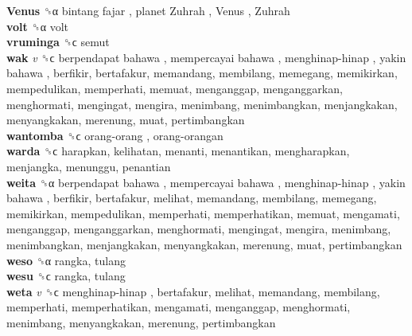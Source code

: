 \textbf{Venus} ␝α   bintang fajar ,  planet Zuhrah ,  Venus ,  Zuhrah   \\
\textbf{volt} ␝α  volt  \\
\textbf{vruminga} ␝ϲ  semut  \\
\textbf{wak} \emph{v}  ␝ϲ   berpendapat bahawa ,  mempercayai bahawa ,  menghinap-hinap ,  yakin bahawa , berfikir, bertafakur, memandang, membilang, memegang, memikirkan, mempedulikan, memperhati, memuat, menganggap, menganggarkan, menghormati, mengingat, mengira, menimbang, menimbangkan, menjangkakan, menyangkakan, merenung, muat, pertimbangkan  \\
\textbf{wantomba} ␝ϲ   orang-orang ,  orang-orangan   \\
\textbf{warda} ␝ϲ  harapkan, kelihatan, menanti, menantikan, mengharapkan, menjangka, menunggu, penantian  \\
\textbf{weita} ␝α   berpendapat bahawa ,  mempercayai bahawa ,  menghinap-hinap ,  yakin bahawa , berfikir, bertafakur, melihat, memandang, membilang, memegang, memikirkan, mempedulikan, memperhati, memperhatikan, memuat, mengamati, menganggap, menganggarkan, menghormati, mengingat, mengira, menimbang, menimbangkan, menjangkakan, menyangkakan, merenung, muat, pertimbangkan  \\
\textbf{weso} ␝α  rangka, tulang  \\
\textbf{wesu} ␝ϲ  rangka, tulang  \\
\textbf{weta} \emph{v}  ␝ϲ   menghinap-hinap , bertafakur, melihat, memandang, membilang, memperhati, memperhatikan, mengamati, menganggap, menghormati, menimbang, menyangkakan, merenung, pertimbangkan  \\
